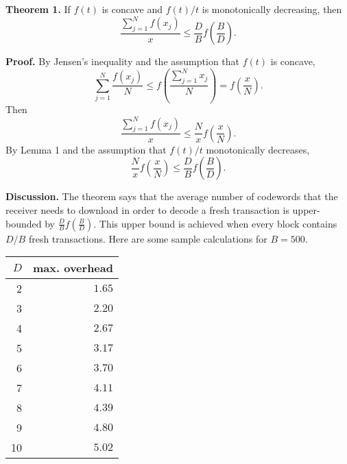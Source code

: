 \documentclass{article}
\begin{document}
\smallskip
\noindent
\textbf{Theorem 1.} If $f(t)$ is concave and $f(t)/t$ is monotonically decreasing, then $$\frac{\sum_{j=1}^N f(x_j)}{x} \le \frac{D}{B}f\left(\frac{B}{D}\right).$$ 

\smallskip \noindent \textbf{Proof.} By Jensen's inequality and the assumption
that $f(t)$ is concave, $$\sum_{j=1}^N \frac{f(x_j)}{N} \le
f\left(\frac{\sum_{j=1}^N x_j}{N}\right) = f\left(\frac{x}{N}\right).$$ Then
$$\frac{\sum_{j=1}^N f(x_j)}{x} \le \frac{N}{x}f\left(\frac{x}{N}\right).$$ By
Lemma 1 and the assumption that $f(t)/t$ monotonically decreases,
$$\frac{N}{x}f\left(\frac{x}{N}\right) \le
\frac{D}{B}f\left(\frac{B}{D}\right).$$ 

\smallskip \noindent \textbf{Discussion.} The theorem says that the average
number of codewords that the receiver needs to download in order to decode a
fresh transaction is upper-bounded by $\frac{D}{B}f\left(\frac{B}{D}\right)$.
This upper bound is achieved when every block contains $D/B$ fresh transactions.
Here are some sample calculations for $B=500$.

\begin{center}
\begin{tabular}{ r|r }
    \hline
    $D$ & max. overhead\\\hline
    2 & $1.65$ \\
    3 & $2.20$ \\
    4 & $2.67$ \\
    5 & $3.17$ \\
    6 & $3.70$ \\
    7 & $4.11$ \\
    8 & $4.39$ \\
    9 & $4.80$ \\
    10 & $5.02$ \\
 \hline
\end{tabular}
\end{center}
\end{document}
